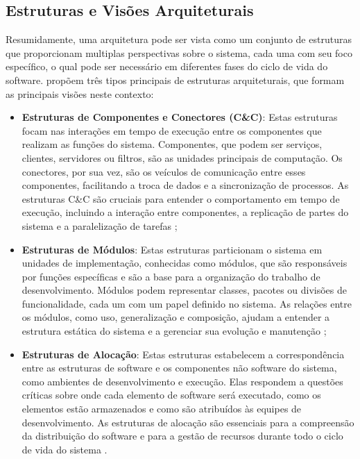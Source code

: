 \subsection{Estruturas e Visões Arquiteturais}

Resumidamente, uma arquitetura pode ser vista como um conjunto de estruturas que proporcionam multiplas perspectivas sobre o sistema, cada uma com seu foco específico, o qual pode ser necessário em diferentes fases do ciclo de vida do software.  propõem três tipos principais de estruturas arquiteturais, que formam as principais visões neste contexto:

\begin{itemize}

    \item \textbf{Estruturas de Componentes e Conectores (C\&C)}: Estas estruturas focam nas interações em tempo de execução entre os componentes que realizam as funções do sistema. Componentes, que podem ser serviços, clientes, servidores ou filtros, são as unidades principais de computação. Os conectores, por sua vez, são os veículos de comunicação entre esses componentes, facilitando a troca de dados e a sincronização de processos. As estruturas C\&C são cruciais para entender o comportamento em tempo de execução, incluindo a interação entre componentes, a replicação de partes do sistema e a paralelização de tarefas \cite{Bass2021};
    
    \item \textbf{Estruturas de Módulos}: Estas estruturas particionam o sistema em unidades de implementação, conhecidas como módulos, que são responsáveis por funções específicas e são a base para a organização do trabalho de desenvolvimento. Módulos podem representar classes, pacotes ou divisões de funcionalidade, cada um com um papel definido no sistema. As relações entre os módulos, como uso, generalização e composição, ajudam a entender a estrutura estática do sistema e a gerenciar sua evolução e manutenção \cite{Bass2021};
    
    \item \textbf{Estruturas de Alocação}: Estas estruturas estabelecem a correspondência entre as estruturas de software e os componentes não software do sistema, como ambientes de desenvolvimento e execução. Elas respondem a questões críticas sobre onde cada elemento de software será executado, como os elementos estão armazenados e como são atribuídos às equipes de desenvolvimento. As estruturas de alocação são essenciais para a compreensão da distribuição do software e para a gestão de recursos durante todo o ciclo de vida do sistema \cite{Bass2021}.
    
\end{itemize}

